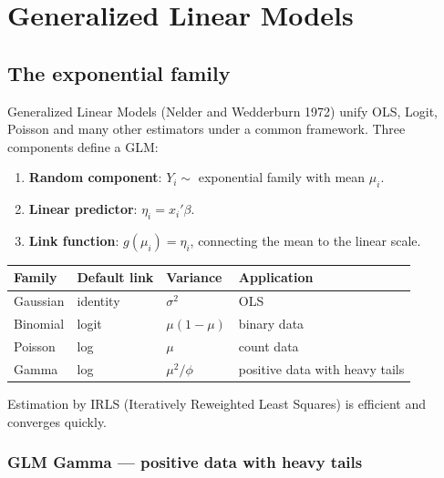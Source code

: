 \chapter{Generalized Linear Models}
\label{cap:glm}

\section{The exponential family}

Generalized Linear Models (Nelder and Wedderburn 1972) unify OLS,
Logit, Poisson and many other estimators under a common framework. Three
components define a GLM:

\begin{enumerate}
  \item \textbf{Random component}: $Y_i \sim$ exponential family with
  mean $\mu_i$.
  \item \textbf{Linear predictor}: $\eta_i = x_i'\beta$.
  \item \textbf{Link function}: $g(\mu_i) = \eta_i$, connecting the mean
  to the linear scale.
\end{enumerate}

\begin{center}
\begin{tabular}{llll}
\toprule
\textbf{Family} & \textbf{Default link} & \textbf{Variance} & \textbf{Application} \\
\midrule
Gaussian    & identity   & $\sigma^2$   & OLS \\
Binomial    & logit      & $\mu(1-\mu)$ & binary data \\
Poisson     & log        & $\mu$        & count data \\
Gamma       & log        & $\mu^2/\phi$ & positive data with heavy tails \\
\bottomrule
\end{tabular}
\end{center}

Estimation by IRLS (Iteratively Reweighted Least Squares) is efficient and
converges quickly.

\subsection*{GLM Gamma — positive data with heavy tails}

